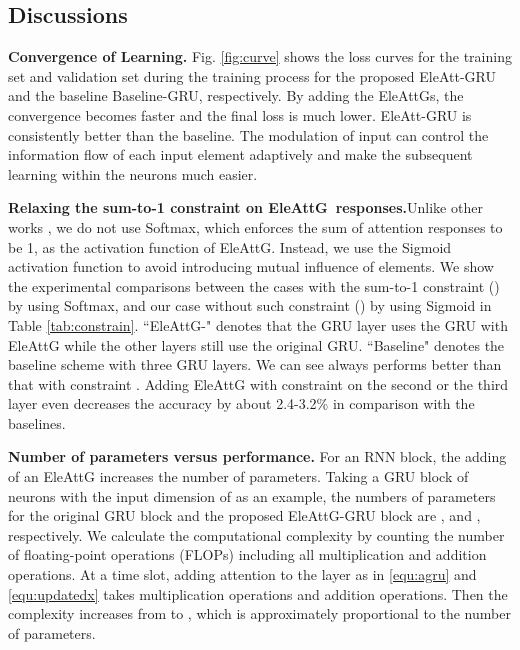 \documentclass[runningheads]{llncs}
\newcommand{\EleAttGn}{{EleAttG}}
\newcommand{\EleAttG}{{EleAttG~}}
\begin{document}
\subsection{Discussions}

\textbf{Convergence of Learning.} Fig. \ref{fig:curve} shows the loss curves for the training set and validation set during the training process for the proposed EleAtt-GRU and the baseline Baseline-GRU, respectively. By adding the {\EleAttGn}s, the convergence becomes faster and the final loss is much lower. EleAtt-GRU is consistently better than the baseline. The modulation of input can control the information flow of each input element adaptively and make the subsequent learning within the neurons much easier. 







\noindent\textbf{Relaxing the sum-to-1 constraint on \EleAttG responses.}Unlike other works \cite{xu2015show,song2017end,liu2017global}, we do not use Softmax, which enforces the sum of attention responses to be 1, as the activation function of EleAttG. Instead, we use the Sigmoid activation function to avoid introducing  mutual influence of elements. We show the experimental comparisons between the cases with the sum-to-1 constraint () by using Softmax, and our case without such constraint () by using Sigmoid in Table \ref{tab:constrain}. ``EleAttG-" denotes that the  GRU layer uses the GRU with EleAttG while the other layers still use the original GRU. ``Baseline" denotes the baseline scheme with three GRU layers. We can see  always performs better than that with constraint . Adding EleAttG with constraint on the second or the third layer even decreases the accuracy by about 2.4-3.2\% in comparison with the baselines. 

\noindent\textbf{Number of parameters versus performance.} For an RNN block, the adding of an EleAttG increases the number of parameters. Taking a GRU block of  neurons with the input dimension of  as an example, the numbers of parameters for the original GRU block and the proposed EleAttG-GRU block are , and , respectively. We calculate the computational complexity by counting the number of floating-point operations (FLOPs) including all multiplication and addition operations. At a time slot, adding attention to the layer as in \ref{equ:agru} and \ref{equ:updatedx} takes  multiplication operations and  addition operations. Then the complexity increases from  to , which is approximately proportional to the number of parameters. 
\end{document}
